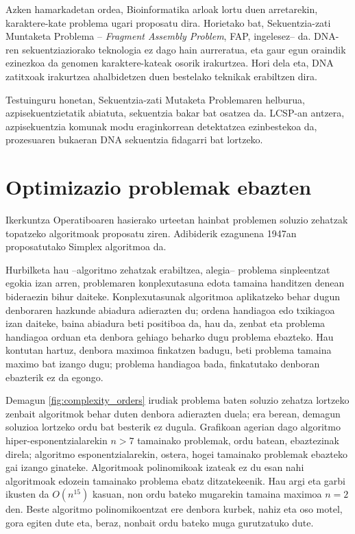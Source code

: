 \documentclass[eu]{ifirak}\usepackage[]{graphicx}\usepackage[]{color}
\begin{document}
Azken hamarkadetan ordea, Bioinformatika arloak lortu duen arretarekin, karaktere-kate problema ugari proposatu dira. Horietako bat, Sekuentzia-zati Muntaketa Problema -- \textit{Fragment Assembly Problem}, FAP, ingelesez-- da. DNA-ren sekuentziaziorako teknologia ez dago hain aurreratua, eta gaur egun oraindik ezinezkoa da genomen karaktere-kateak osorik irakurtzea. Hori dela eta, DNA zatitxoak irakurtzea ahalbidetzen duen bestelako teknikak erabiltzen dira.

Testuinguru honetan, Sekuentzia-zati Mutaketa Problemaren helburua, azpisekuentzietatik abiatuta, sekuentzia bakar bat osatzea da. LCSP-an antzera, azpisekuentzia komunak modu eraginkorrean detektatzea ezinbestekoa da, prozesuaren bukaeran DNA sekuentzia fidagarri bat lortzeko.

\section{Optimizazio problemak ebazten}

Ikerkuntza Operatiboaren hasierako urteetan hainbat problemen soluzio zehatzak topatzeko algoritmoak proposatu ziren. Adibiderik ezagunena 1947an proposatutako Simplex algoritmoa da. 

Hurbilketa hau --algoritmo zehatzak erabiltzea, alegia-- problema sinpleentzat egokia izan arren, problemaren konplexutasuna edota tamaina handitzen denean bideraezin bihur daiteke. Konplexutasunak algoritmoa aplikatzeko behar dugun denboraren hazkunde abiadura adierazten du; ordena handiagoa edo txikiagoa izan daiteke, baina abiadura beti positiboa da, hau da, zenbat eta problema handiagoa orduan eta denbora gehiago beharko dugu problema ebazteko. Hau kontutan hartuz, denbora maximoa finkatzen badugu, beti problema tamaina maximo bat izango dugu; problema handiagoa bada, finkatutako denboran ebazterik ez da egongo.


Demagun \ref{fig:complexity_orders} irudiak problema baten soluzio zehatza lortzeko zenbait algoritmok behar duten denbora adierazten duela; era berean, demagun soluzioa lortzeko ordu bat besterik ez dugula. Grafikoan agerian dago algoritmo hiper-esponentzialarekin $n>7$ tamainako problemak, ordu batean, ebaztezinak direla; algoritmo esponentzialarekin, ostera, hogei tamainako problemak ebazteko gai izango ginateke. Algoritmoak polinomikoak izateak ez du esan nahi algoritmoak edozein tamainako problema ebatz ditzatekeenik. Hau argi eta garbi ikusten da $O(n^{15})$ kasuan, non ordu bateko mugarekin tamaina maximoa $n=2$ den. Beste algoritmo polinomikoentzat ere denbora kurbek, nahiz eta oso motel, gora egiten dute eta, beraz, nonbait ordu bateko muga gurutzatuko dute.
\end{document}
